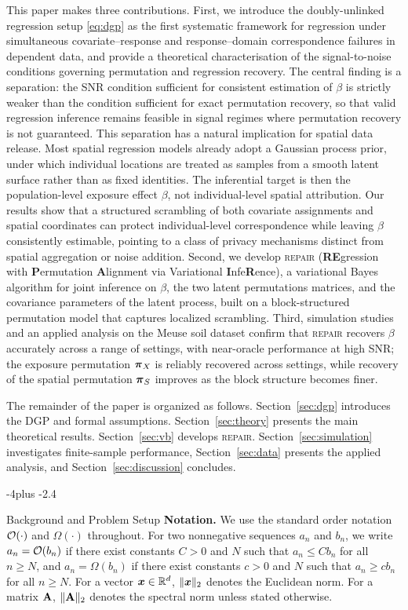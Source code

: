 \documentclass[numsec,webpdf,modern,medium,namedate]{oup-authoring-template}
\makeatletter
\theoremstyle{thmstyleone}%
\theoremstyle{thmstyletwo}%
\theoremstyle{thmstylethree}%
\def\section{%
  \@startsection{section}{1}{\z@}
  {-4\p@ plus -2\p@}{\if@traditional\if@large.4\p@\else\if@medium6.5\p@\else4\p@\fi\fi\else\if@contemporary5\p@\else4\p@\fi\fi}
  {\reset@font\raggedright\secsize}}
\makeatother
\begin{document}
This paper makes three contributions.
First, we introduce the doubly-unlinked regression setup \eqref{eq:dgp} as the
first systematic framework for regression under simultaneous covariate--response
and response--domain correspondence failures in dependent data, and provide a
theoretical characterisation of the signal-to-noise conditions governing
permutation and regression recovery.
The central finding is a separation: the SNR condition sufficient for
consistent estimation of $\beta$ is strictly weaker than the condition
sufficient for exact permutation recovery, so that valid regression inference
remains feasible in signal regimes where permutation recovery is not guaranteed.
This separation has a natural implication for spatial data release.
Most spatial regression models already adopt a Gaussian process prior, under
which individual locations are treated as samples from a smooth latent surface
rather than as fixed identities.
The inferential target is then the population-level exposure effect $\beta$,
not individual-level spatial attribution.
Our results show that a structured scrambling of both covariate assignments and
spatial coordinates can protect individual-level correspondence while leaving
$\beta$ consistently estimable, pointing to a class of privacy mechanisms
distinct from spatial aggregation or noise addition.
Second, we develop \textsc{repair} (\textbf{RE}gression with \textbf{P}ermutation
\textbf{A}lignment via Variational \textbf{I}nfe\textbf{R}ence), a variational
Bayes algorithm for joint inference on $\beta$, the two latent permutations
matrices, and the covariance parameters of the latent process, built on a
block-structured permutation model that captures localized scrambling.
Third, simulation studies and an applied analysis on the Meuse soil dataset
confirm that \textsc{repair} recovers $\beta$ accurately across a range of
settings, with near-oracle performance at high SNR; the exposure permutation
$\boldsymbol{\pi}_X$ is reliably recovered across settings, while recovery of the spatial
permutation $\boldsymbol{\pi}_S$ improves as the block structure becomes finer.

The remainder of the paper is organized as follows.
Section~\ref{sec:dgp} introduces the DGP and formal
assumptions.
Section~\ref{sec:theory} presents the main theoretical results.
Section~\ref{sec:vb} develops \textsc{repair}.
Section~\ref{sec:simulation} investigates finite-sample performance,
Section~\ref{sec:data} presents the applied analysis, and
Section~\ref{sec:discussion} concludes.

\section{Background and Problem Setup}\label{sec:dgp}
\textbf{Notation.}
We use the standard order notation $\mathcal{O}(\cdot)$ and $\Omega(\cdot)$ throughout. For two nonnegative sequences $a_n$ and $b_n$, we write $a_n=\mathcal{O}(b_n)$ if there exist constants $C>0$ and $N$ such that $a_n\le C b_n$ for all $n\ge N$, and $a_n=\Omega(b_n)$ if there exist constants $c>0$ and $N$ such that $a_n\ge c b_n$ for all $n\ge N$. For a vector $\boldsymbol{x}\in\mathbb{R}^d$, $\|\boldsymbol{x}\|_2$ denotes the Euclidean norm. For a matrix $\mathbf{A}$, $\|\mathbf{A}\|_2$ denotes the spectral norm unless stated otherwise.
\end{document}

